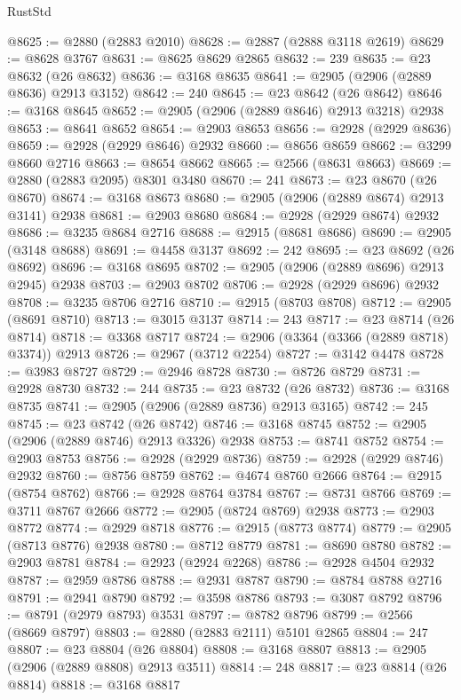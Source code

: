 \begin{lexlean}{RustStd}
\begin{coremodule}
@8625 := @2880 (@2883 @2010)
@8628 := @2887 (@2888 @3118 @2619)
@8629 := @8628 @3767
@8631 := @8625 @8629 @2865
@8632 := 239
@8635 := @23 @8632 (@26 @8632)
@8636 := @3168 @8635
@8641 := @2905 (@2906 (@2889 @8636) @2913 @3152)
@8642 := 240
@8645 := @23 @8642 (@26 @8642)
@8646 := @3168 @8645
@8652 := @2905 (@2906 (@2889 @8646) @2913 @3218) @2938
@8653 := @8641 @8652
@8654 := @2903 @8653
@8656 := @2928 (@2929 @8636)
@8659 := @2928 (@2929 @8646) @2932
@8660 := @8656 @8659
@8662 := @3299 @8660 @2716
@8663 := @8654 @8662
@8665 := @2566 (@8631 @8663)
@8669 := @2880 (@2883 @2095) @8301 @3480
@8670 := 241
@8673 := @23 @8670 (@26 @8670)
@8674 := @3168 @8673
@8680 := @2905 (@2906 (@2889 @8674) @2913 @3141) @2938
@8681 := @2903 @8680
@8684 := @2928 (@2929 @8674) @2932
@8686 := @3235 @8684 @2716
@8688 := @2915 (@8681 @8686)
@8690 := @2905 (@3148 @8688)
@8691 := @4458 @3137
@8692 := 242
@8695 := @23 @8692 (@26 @8692)
@8696 := @3168 @8695
@8702 := @2905 (@2906 (@2889 @8696) @2913 @2945) @2938
@8703 := @2903 @8702
@8706 := @2928 (@2929 @8696) @2932
@8708 := @3235 @8706 @2716
@8710 := @2915 (@8703 @8708)
@8712 := @2905 (@8691 @8710)
@8713 := @3015 @3137
@8714 := 243
@8717 := @23 @8714 (@26 @8714)
@8718 := @3368 @8717
@8724 := @2906 (@3364 (@3366 (@2889 @8718) @3374)) @2913
@8726 := @2967 (@3712 @2254)
@8727 := @3142 @4478
@8728 := @3983 @8727
@8729 := @2946 @8728
@8730 := @8726 @8729
@8731 := @2928 @8730
@8732 := 244
@8735 := @23 @8732 (@26 @8732)
@8736 := @3168 @8735
@8741 := @2905 (@2906 (@2889 @8736) @2913 @3165)
@8742 := 245
@8745 := @23 @8742 (@26 @8742)
@8746 := @3168 @8745
@8752 := @2905 (@2906 (@2889 @8746) @2913 @3326) @2938
@8753 := @8741 @8752
@8754 := @2903 @8753
@8756 := @2928 (@2929 @8736)
@8759 := @2928 (@2929 @8746) @2932
@8760 := @8756 @8759
@8762 := @4674 @8760 @2666
@8764 := @2915 (@8754 @8762)
@8766 := @2928 @8764 @3784
@8767 := @8731 @8766
@8769 := @3711 @8767 @2666
@8772 := @2905 (@8724 @8769) @2938
@8773 := @2903 @8772
@8774 := @2929 @8718
@8776 := @2915 (@8773 @8774)
@8779 := @2905 (@8713 @8776) @2938
@8780 := @8712 @8779
@8781 := @8690 @8780
@8782 := @2903 @8781
@8784 := @2923 (@2924 @2268)
@8786 := @2928 @4504 @2932
@8787 := @2959 @8786
@8788 := @2931 @8787
@8790 := @8784 @8788 @2716
@8791 := @2941 @8790
@8792 := @3598 @8786
@8793 := @3087 @8792
@8796 := @8791 (@2979 @8793) @3531
@8797 := @8782 @8796
@8799 := @2566 (@8669 @8797)
@8803 := @2880 (@2883 @2111) @5101 @2865
@8804 := 247
@8807 := @23 @8804 (@26 @8804)
@8808 := @3168 @8807
@8813 := @2905 (@2906 (@2889 @8808) @2913 @3511)
@8814 := 248
@8817 := @23 @8814 (@26 @8814)
@8818 := @3168 @8817

\end{coremodule}
\end{lexlean}
